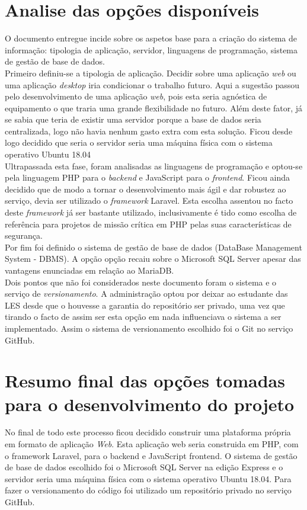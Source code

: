\section{Analise das opções disponíveis}
O documento entregue incide sobre os aspetos base para a criação do sistema de informação: tipologia de aplicação, servidor, linguagens de programação, sistema de gestão de base de dados.\\
Primeiro definiu-se a tipologia de aplicação. Decidir sobre uma aplicação \textit{web} ou uma aplicação \textit{desktop} iria condicionar o trabalho futuro. Aqui a sugestão passou pelo desenvolvimento de uma aplicação \textit{web}, pois esta seria agnóstica de equipamento o que traria uma grande flexibilidade no futuro. Além deste fator, já se sabia que teria de existir uma servidor porque a base de dados seria  centralizada, logo não havia nenhum gasto extra com esta solução. Ficou desde logo decidido que seria o servidor seria uma máquina física com o sistema operativo Ubuntu 18.04\\
Ultrapassada esta fase, foram analisadas as linguagens de programação e optou-se pela linguagem PHP para o \textit{backend} e JavaScript para o \textit{frontend}. Ficou ainda decidido que de modo a tornar o desenvolvimento mais ágil e dar robustez ao serviço, devia ser utilizado o \textit{framework} Laravel. Esta escolha assentou no facto deste \textit{framework} já ser bastante utilizado, inclusivamente é tido como escolha de referência para projetos de missão crítica em PHP pelas suas características de segurança\cite{Mansuri2018}.\\
Por fim foi definido o sistema de gestão de base de dados (DataBase Management System - DBMS\label{sym:DBMS}). A opção opção recaiu sobre o Microsoft SQL Server apesar das vantagens enunciadas em relação ao MariaDB.\\
Dois pontos que não foi considerados neste documento foram o sistema e o serviço de \textit{versionamento}. A administração optou por deixar ao estudante das LES desde que o houvesse a garantia do repositório ser privado, uma vez que tirando o facto de assim ser esta opção em nada influenciava o sistema a ser implementado. Assim o sistema de versionamento escolhido foi o Git no serviço GitHub.

\section{Resumo final das opções tomadas para o desenvolvimento do projeto}
No final de todo este processo ficou decidido construir uma plataforma própria em formato de aplicação \textit{Web}. Esta aplicação web seria construida em PHP, com o framework Laravel, para o backend e JavaScript frontend. O sistema de gestão de base de dados escolhido foi o Microsoft SQL Server na edição Express e o servidor seria uma máquina física com o sistema operativo Ubuntu 18.04. Para fazer o versionamento do código foi utilizado um repositório privado no serviço GitHub.